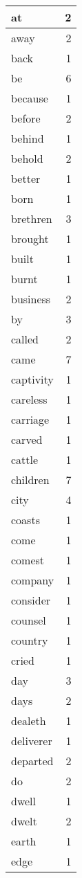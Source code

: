 \begin{center}
\begin{longtable}{l|r}
at & 2\\ \hline 
away & 2\\ \hline 
back & 1\\ \hline 
be & 6\\ \hline 
because & 1\\ \hline 
before & 2\\ \hline 
behind & 1\\ \hline 
behold & 2\\ \hline 
better & 1\\ \hline 
born & 1\\ \hline 
brethren & 3\\ \hline 
brought & 1\\ \hline 
built & 1\\ \hline 
burnt & 1\\ \hline 
business & 2\\ \hline 
by & 3\\ \hline 
called & 2\\ \hline 
came & 7\\ \hline 
captivity & 1\\ \hline 
careless & 1\\ \hline 
carriage & 1\\ \hline 
carved & 1\\ \hline 
cattle & 1\\ \hline 
children & 7\\ \hline 
city & 4\\ \hline 
coasts & 1\\ \hline 
come & 1\\ \hline 
comest & 1\\ \hline 
company & 1\\ \hline 
consider & 1\\ \hline 
counsel & 1\\ \hline 
country & 1\\ \hline 
cried & 1\\ \hline 
day & 3\\ \hline 
days & 2\\ \hline 
dealeth & 1\\ \hline 
deliverer & 1\\ \hline 
departed & 2\\ \hline 
do & 2\\ \hline 
dwell & 1\\ \hline 
dwelt & 2\\ \hline 
earth & 1\\ \hline 
edge & 1\\ \hline 

\end{longtable}
\end{center}
